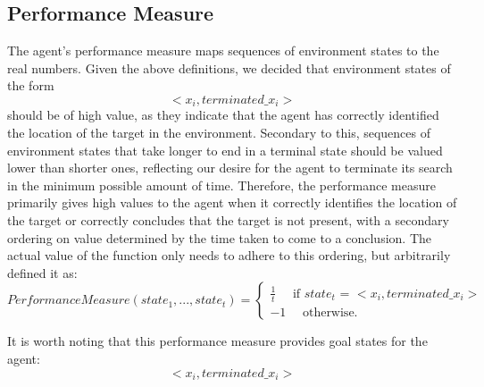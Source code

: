 \subsection{Performance Measure}\label{sssection:PerfMeas}
The agent's performance measure maps sequences of environment states to the real numbers. Given the above definitions, we decided that environment states of the form
\[ <x_i, terminated\_x_i> \]
should be of high value, as they indicate that the agent has correctly identified the location of the target in the environment. Secondary to this, sequences of environment states that take longer to end in a terminal state should be valued lower than shorter ones, reflecting our desire for the agent to terminate its search in the minimum possible amount of time. Therefore, the performance measure primarily gives high values to the agent when it correctly identifies the location of the target or correctly concludes that the target is not present, with a secondary ordering on value determined by the time taken to come to a conclusion. The actual value of the function only needs to adhere to this ordering, but arbitrarily defined it as:
\[
Performance Measure(state_1,..., state_t) = 
\begin{cases}
\frac{1}{t} \quad \text{ if } state_t \text{ = } <x_i, terminated\_x_i>
\\
-1 \quad \text { otherwise. }
\end{cases}
\]


It is worth noting that this performance measure provides goal states for the agent:
\[ <x_i, terminated\_x_i> \]